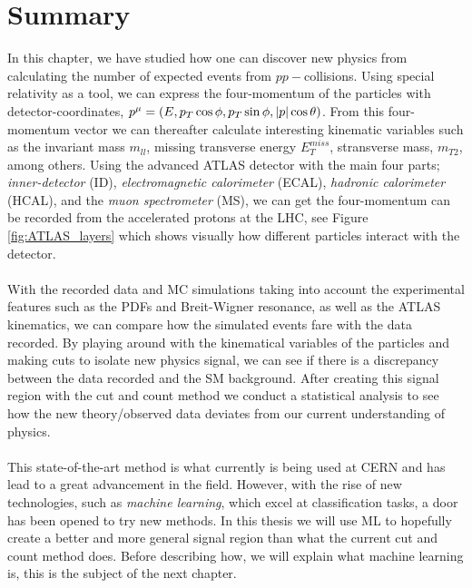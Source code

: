 \documentclass[12pt, a4paper]{book}
\begin{document}
\clearpage
\section{Summary}
In this chapter, we have studied how one can discover new physics from calculating the number of expected events from $pp-$collisions. Using special relativity as a tool, we can express the four-momentum of the particles with 
detector-coordinates, $p^\mu=(E,p_T\cos\phi,p_T\sin\phi,\abs{p}\cos\theta)$. From this four-momentum vector we can thereafter calculate interesting kinematic variables such as the invariant mass $m_{ll}$, missing transverse energy $E_T^{miss}$, 
stransverse mass, $m_{T2}$, among others. Using the advanced ATLAS detector with the main four parts; \textit{inner-detector} (ID), \textit{electromagnetic calorimeter} (ECAL), \textit{hadronic calorimeter} (HCAL), and the \textit{muon spectrometer} (MS), 
we can get the four-momentum can be recorded from the accelerated protons at the LHC, see Figure \ref{fig:ATLAS_layers} which shows visually how different particles interact with the detector.\\
\\With the recorded data and MC simulations taking into account the experimental features such as the PDFs and Breit-Wigner resonance, as well as the ATLAS kinematics, we can compare how the simulated events fare with the data recorded. 
By playing around with the kinematical variables of the particles and making cuts to isolate new physics signal, we can see if there is a discrepancy between the data recorded and the SM background. After creating this signal region with the cut and count 
method we conduct a statistical analysis to see how the new theory/observed data deviates from our current understanding of physics.\\
\\This state-of-the-art method is what currently is being used at CERN and has lead to a great advancement in the field. However, with the rise of new technologies, such as \textit{machine learning}, which excel at classification tasks, a door has been 
opened to try new methods. In this thesis we will use ML to hopefully create a better and more general signal region than what the current cut and count method does. Before describing how, we will explain what machine learning is, this is the subject 
of the next chapter.
\end{document}
